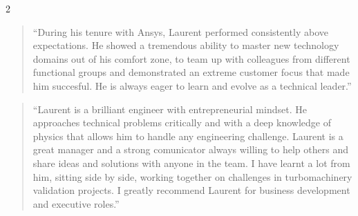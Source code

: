 \documentclass[9pt,a4paper,ragged2e,withhyper]{altacv} %
\begin{document}
\begin{paracol}{2}
\divider

\printbibliography[heading=pubtype,title={\printinfo{\faFile*[regular]}{Journal Articles}},type=article]

\divider

\printbibliography[heading=pubtype,title={\printinfo{\faUsers}{Conference Proceedings}},type=inproceedings]



\begin{quotation}
    ``During his tenure with Ansys, Laurent performed consistently above expectations. He showed a tremendous ability to master new technology domains out of his comfort zone, to team up with colleagues from different functional groups and demonstrated an extreme customer focus that made him succesful. He is always eager to learn and evolve as a technical leader.''
\end{quotation}

\medskip

\begin{quotation}
  ``Laurent is a brilliant engineer with entrepreneurial mindset. He approaches technical problems critically and with a deep knowledge of physics that allows him to handle any engineering challenge. Laurent is a great manager and a strong comunicator always willing to help others and share ideas and solutions with anyone in the team. I have learnt a lot from him, sitting side by side, working together on challenges in turbomachinery validation projects. I greatly recommend Laurent for business development and executive roles.''
\end{quotation}


\end{paracol}
\end{document}
